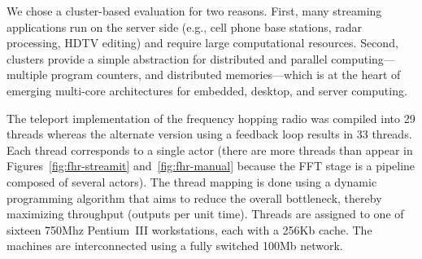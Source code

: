 \documentclass{sig-alternate}
\begin{document}



We chose a cluster-based evaluation for two reasons.  First, many
streaming applications run on the server side (e.g., cell phone base
stations, radar processing, HDTV editing) and require large
computational resources. Second, clusters provide a simple abstraction
for distributed and parallel computing---multiple program counters,
and distributed memories---which is at the heart of emerging
multi-core architectures for embedded, desktop, and server computing.

The teleport implementation of the frequency hopping radio was
compiled into 29 threads whereas the alternate version using a
feedback loop results in 33 threads.  Each thread corresponds to a
single actor (there are more threads than appear in
Figures~\ref{fig:fhr-streamit} and~\ref{fig:fhr-manual} because the
FFT stage is a pipeline composed of several actors).  The thread
mapping is done using a dynamic programming algorithm that aims to
reduce the overall bottleneck, thereby maximizing throughput (outputs
per unit time).  Threads are assigned to one of sixteen 750Mhz
Pentium~III workstations, each with a 256Kb cache.  The machines are
interconnected using a fully switched 100Mb network.
\end{document}
